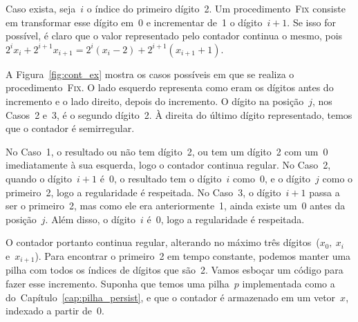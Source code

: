 \documentclass[main.tex]{subfiles}
\begin{document}
Caso exista, seja~$i$ o índice do primeiro dígito~2. Um procedimento~\textsc{Fix} consiste em transformar esse dígito em~0 e incrementar de~1 o dígito~$i+1$. Se isso for possível, é claro que o valor representado pelo contador continua o mesmo, pois~$2^i x_i + 2^{i+1} x_{i+1} = 2^i (x_i - 2) + 2^{i+1} (x_{i+1} + 1)$.

A Figura~\ref{fig:cont_ex} mostra os casos possíveis em que se realiza o procedimento~\textsc{Fix}. O lado esquerdo representa como eram os dígitos antes do incremento e o lado direito, depois do incremento. O dígito na posição~$j$, nos Casos~2 e~3, é o segundo dígito~2. À direita do último dígito representado, temos que o contador é semirregular.

No Caso~1, o resultado ou não tem dígito~2, ou tem um dígito~2 com um~0 imediatamente à sua esquerda, logo o contador continua regular. No Caso~2, quando o dígito~$i + 1$ é~0, o resultado tem o dígito~$i$ como~0, e o dígito~$j$ como o primeiro~2, logo a regularidade é respeitada. No Caso~3, o dígito~$i+1$ passa a ser o primeiro~2, mas como ele era anteriormente~1, ainda existe um~0 antes da posição~$j$. Além disso, o dígito~$i$ é~0, logo a regularidade é respeitada.

O contador portanto continua regular, alterando no máximo três dígitos~($x_0,\ x_i$ e~$x_{i+1}$). Para encontrar o primeiro~2 em tempo constante, podemos manter uma pilha com todos os índices de dígitos que são~2. Vamos esboçar um código para fazer esse incremento. Suponha que temos uma pilha~$p$ implementada como a do~Capítulo~\ref{cap:pilha_persist}, e que o contador é armazenado em um vetor~$x$, indexado a partir de~0.
\end{document}
